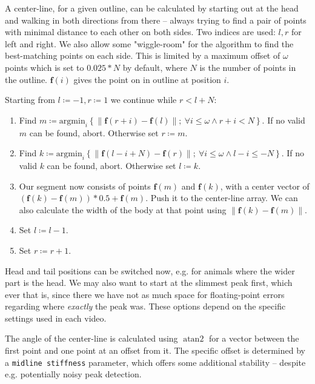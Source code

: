 \documentclass[9pt,lineno]{elife}
\newcommand{\norm}[1]{\left\lVert#1\right\rVert}
\DeclareMathOperator{\atantwo}{atan2}
\begin{document}
\begin{appendixbox}
A center-line, for a given outline, can be calculated by starting out at the head and walking in both directions from there -- always trying to find a pair of points with minimal distance to each other on both sides. Two indices are used: $l,r$ for left and right. We also allow some "wiggle-room" for the algorithm to find the best-matching points on each side. This is limited by a maximum offset of $\omega$ points which is set to $0.025 * N$ by default, where $N$ is the number of points in the outline. $\mathbf{f}(i)$ gives the point on in outline at position $i$.

Starting from $l\coloneqq-1,r\coloneqq 1$ we continue while $r < l + N$:

\begin{enumerate}
    \item Find $m\coloneqq \mathrm{argmin}_i \left\{ \norm{\mathbf{f}(r+i) - \mathbf{f}(l)};\ \forall i \leq \omega \wedge r+i < N \right\}$. If no valid $m$ can be found, abort. Otherwise set $r\coloneqq m$.
    
    \item Find $k\coloneqq \mathrm{argmin}_i \left\{ \norm{\mathbf{f}(l-i+N) - \mathbf{f}(r)};\ \forall i \leq \omega \wedge l-i \leq -N \right\}$. If no valid $k$ can be found, abort. Otherwise set $l\coloneqq k$.
    
    \item Our segment now consists of points $\mathbf{f}(m)$ and $\mathbf{f}(k)$, with a center vector of $(\mathbf{f}(k) - \mathbf{f}(m)) * 0.5 + \mathbf{f}(m)$. Push it to the center-line array. We can also calculate the width of the body at that point using $\norm{\mathbf{f}(k) - \mathbf{f}(m)}$.
    
    \item Set $l\coloneqq l - 1$.
    \item Set $r\coloneqq r + 1$.
\end{enumerate}

Head and tail positions can be switched now, e.g. for animals where the wider part is the head. We may also want to start at the slimmest peak first, which ever that is, since there we have not as much space for floating-point errors regarding where \textit{exactly} the peak was. These options depend on the specific settings used in each video.

The angle of the center-line is calculated using $\atantwo$ for a vector between the first point and one point at an offset from it. The specific offset is determined by a \texttt{midline stiffness} parameter, which offers some additional stability -- despite e.g. potentially noisy peak detection.


\end{appendixbox}
\end{document}
